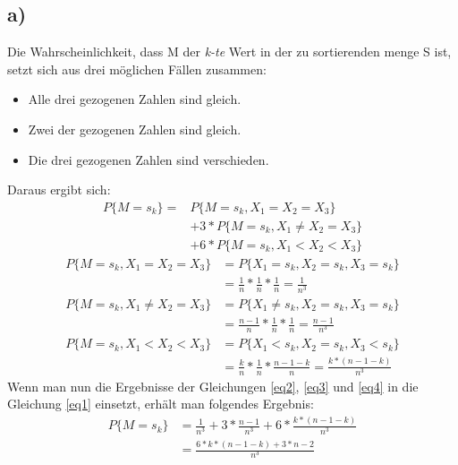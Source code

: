     \subsection*{a)}

      Die Wahrscheinlichkeit, dass M der \textit{k-te} Wert in der zu sortierenden menge S ist, setzt sich aus drei möglichen Fällen zusammen:
      \begin{itemize}
      	\item Alle drei gezogenen Zahlen sind gleich.
      	\item Zwei der gezogenen Zahlen sind gleich.
      	\item Die drei gezogenen Zahlen sind verschieden.
      \end{itemize}
      Daraus ergibt sich:
      \begin{equation} \label{eq1}
      	\begin{split}
      	  P\{ M=s_k \} = & P\{ M=s_k , X_1 =X_2 =X_3 \} \\
      	  & + 3*P\{ M=s_k , X_1 \neq X_2 = X_3 \}\\
      	  & + 6*P\{ M=s_k , X_1 < X_2 < X_3 \}
      	  \end{split}
      \end{equation}
      \begin{equation} \label{eq2}
        \begin{split}
          P\{ M=s_k , X_1 =X_2 =X_3 \} & = P\{X_1 =s_k , X_2 =s_k , X_3 =s_k \}\\
          & = \frac{1}{n} * \frac{1}{n} * \frac{1}{n} = \frac{1}{n^3}
        \end{split}
      \end{equation}
      \begin{equation} \label{eq3}
      	\begin{split}
      	  P\{ M=s_k , X_1 \neq X_2 =X_3 \} & = P\{X_1 \neq s_k , X_2 =s_k , X_3 =s_k \}\\
      	  & = \frac{n-1}{n} * \frac{1}{n} * \frac{1}{n} = \frac{n-1}{n^3}
      	\end{split}
      \end{equation}
      \begin{equation} \label{eq4}
      	\begin{split}
      	  P\{ M=s_k , X_1 < X_2 < X_3 \} & = P\{X_1 < s_k , X_2 =s_k , X_3 < s_k \}\\
      	  & = \frac{k}{n} * \frac{1}{n} * \frac{n-1-k}{n} = \frac{k*(n-1-k)}{n^3}
      	\end{split}
      \end{equation}
      \newpage
      Wenn man nun die Ergebnisse der Gleichungen \ref{eq2}, \ref{eq3} und \ref{eq4} in die Gleichung \ref{eq1} einsetzt, erhält man folgendes Ergebnis:
      \begin{equation} \label{eq5}
      	\begin{split}
      	  P\{ M=s_k \} & = \frac{1}{n^3} + 3*\frac{n-1}{n^3} + 6*\frac{k*(n-1-k
      	  	)}{n^3} \\
      	  & = \frac{6*k*(n-1-k) + 3*n - 2}{n^3}
      	\end{split}
      \end{equation}

